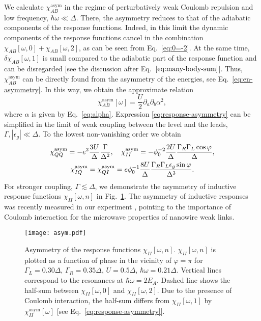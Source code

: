 \documentclass[aps,reprint,longbibliography, prb]{revtex4-2}
\begin{document}
We calculate $\chi_{AB}^\mathrm{asym}$ in the regime of perturbatively weak Coulomb repulsion and low frequency, $\hbar\omega \ll \Delta$.
There, the asymmetry reduces to that of the adiabatic components of the response functions. Indeed, in this limit the dynamic components of the response functions cancel in the combination $\chi_{AB}[\omega,0]+\chi_{AB}[\omega,2] $, as can be seen from Eq.~\eqref{eq:0=-2}. At the same time,  $\delta\chi_{AB}[\omega, 1]$ is small compared to the adiabatic part of the response function and can be disregarded [see the discussion after Eq.~$\eqref{eq:many-body-sum}$]. Thus,  $\chi^\mathrm{asym}_{AB}$ can be directly found from the asymmetry of the energies, see Eq.~\eqref{eq:en-asymmetry}. In this way, we obtain the approximate relation
\begin{equation}
\label{eq:response-asymmetry}
    \chi_{AB}^{\mathrm{asym}}[\omega] = \frac{U}{2}\partial_a \partial_b \alpha^2,
\end{equation}
where $\alpha$ is given by Eq.~\eqref{eq:alpha}. Expression \eqref{eq:response-asymmetry} can be simplified in the limit of weak coupling between the level and the leads, $\Gamma,|\epsilon_g| \ll \Delta$. To the lowest non-vanishing order we obtain
\begin{gather}
    \chi_{QQ}^{\mathrm{asym}} = - e^2\frac{3U}{\Delta}\frac{\Gamma}{\Delta^2},\quad \chi_{II}^{\mathrm{asym}}  = -\phi_0^{-2}\frac{2U}{\Delta}\frac{\Gamma_R \Gamma_L \cos\varphi}{\Delta},\notag\\
    \chi_{IQ}^{\mathrm{asym}} = \chi_{QI}^{\mathrm{asym}} = e \phi_0^{-1}\frac{8U}{\Delta} \frac{\Gamma_R\Gamma_L \epsilon_g \sin \varphi}{\Delta^3}.
\end{gather}
For stronger coupling, $\Gamma\lesssim\Delta$, we demonstrate the asymmetry of inductive response functions $\chi_{II}[\omega, n]$ in Fig.~\ref{fig:asym}. The asymmetry of inductive responses was recently measured in our experiment \cite{fatemi2021}, pointing to the importance of Coulomb interaction for the microwave properties of nanowire weak links.

\begin{figure}[t]
  \begin{center}
    \texttt{[image: asym.pdf]}
    \caption{Asymmetry of the response functions $\chi_{II}[\omega, n]$. $\chi_{II}[\omega,n]$ is plotted as a function of phase in the vicinity of $\varphi = \pi$ for $\Gamma_L = 0.30 \Delta$, $\Gamma_R = 0.35 \Delta$, $U = 0.5 \Delta$, $\hbar\omega = 0.21 \Delta$.
    Vertical lines correspond to the resonances at $\hbar\omega = 2E_A$. Dashed line shows the half-sum between $\chi_{II}[\omega, 0]$ and $\chi_{II}[\omega, 2]$. Due to the presence of Coulomb interaction, the half-sum differs from $\chi_{II}[\omega, 1]$ by $\chi_{II}^\mathrm{asym}[\omega]$ [see Eq.~\eqref{eq:response-asymmetry}]. \label{fig:asym}}
  \end{center}
\end{figure}
\end{document}
